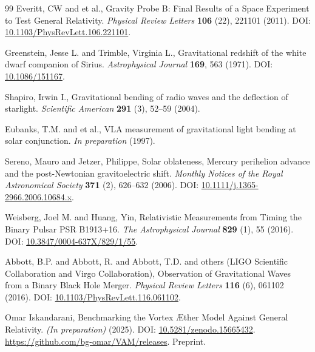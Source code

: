 \documentclass[a4paper, aps,preprint,superscriptaddress, 12pt]{revtex4}
\begin{document}
\begin{thebibliography}{99}
Everitt, CW and et al.,
\newblock Gravity Probe B: Final Results of a Space Experiment to Test General Relativity.
\textit{Physical Review Letters} \textbf{106} (22), 221101 (2011).
\newblock DOI: \href{https://doi.org/10.1103/PhysRevLett.106.221101}{10.1103/PhysRevLett.106.221101}.


Greenstein, Jesse L. and Trimble, Virginia L.,
\newblock Gravitational redshift of the white dwarf companion of Sirius.
\textit{Astrophysical Journal} \textbf{169}, 563 (1971).
\newblock DOI: \href{https://doi.org/10.1086/151167}{10.1086/151167}.


Shapiro, Irwin I.,
\newblock Gravitational bending of radio waves and the deflection of starlight.
\textit{Scientific American} \textbf{291} (3), 52--59 (2004).


Eubanks, T.M. and et al.,
\newblock VLA measurement of gravitational light bending at solar conjunction.
\textit{In preparation} (1997).


Sereno, Mauro and Jetzer, Philippe,
\newblock Solar oblateness, Mercury perihelion advance and the post-Newtonian gravitoelectric shift.
\textit{Monthly Notices of the Royal Astronomical Society} \textbf{371} (2), 626--632 (2006).
\newblock DOI: \href{https://doi.org/10.1111/j.1365-2966.2006.10684.x}{10.1111/j.1365-2966.2006.10684.x}.


Weisberg, Joel M. and Huang, Yin,
\newblock Relativistic Measurements from Timing the Binary Pulsar PSR B1913+16.
\textit{The Astrophysical Journal} \textbf{829} (1), 55 (2016).
\newblock DOI: \href{https://doi.org/10.3847/0004-637X/829/1/55}{10.3847/0004-637X/829/1/55}.


Abbott, B.P. and Abbott, R. and Abbott, T.D. and others (LIGO Scientific Collaboration and Virgo Collaboration),
\newblock Observation of Gravitational Waves from a Binary Black Hole Merger.
\textit{Physical Review Letters} \textbf{116} (6), 061102 (2016).
\newblock DOI: \href{https://doi.org/10.1103/PhysRevLett.116.061102}{10.1103/PhysRevLett.116.061102}.


Omar Iskandarani,
\newblock Benchmarking the Vortex Æther Model Against General Relativity.
\textit{(In preparation)} (2025).
\newblock DOI: \href{https://doi.org/10.5281/zenodo.15665432}{10.5281/zenodo.15665432}.
\newblock \url{https://github.com/bg-omar/VAM/releases}.
\newblock Preprint.



\end{thebibliography}
\end{document}
